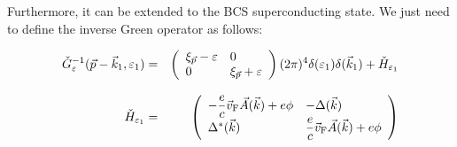 \documentclass[uplatex,a4j,12pt,dvipdfmx]{jsarticle}
\begin{document}
Furthermore, it can be extended to the BCS superconducting state. We just need to define the inverse Green operator as follows:

\begin{eqnarray}
	\check{G}^{-1}_{\varepsilon}(\vec{p}-\vec{k}_{1},\varepsilon_{1})
	&=&
	\left(
	\begin{array}{ll}
		\xi_{\vec{p}} - \varepsilon & 0
		\\
		0                           & \xi_{\vec{p}} + \varepsilon
	\end{array}
	\right)
	(2 \pi)^{4}
	\delta(\varepsilon_{1})
	\delta(\vec{k}_{1})
	+
	\check{H}_{\varepsilon_{1}}
	\\[3mm]
	\check{H}_{\varepsilon_{1}}
	&=&
	\left(
	\begin{array}{ll}
			- \dfrac{e}{c} \vec{v}_{\rm F} \vec{A}(\vec{k}) + e \phi & - \Delta(\vec{k})
			\\
			\Delta^{*}(\vec{k})                                      & \dfrac{e}{c} \vec{v}_{\rm F} \vec{A}(\vec{k}) + e \phi
		\end{array}
	\right)
\end{eqnarray}
\end{document}
